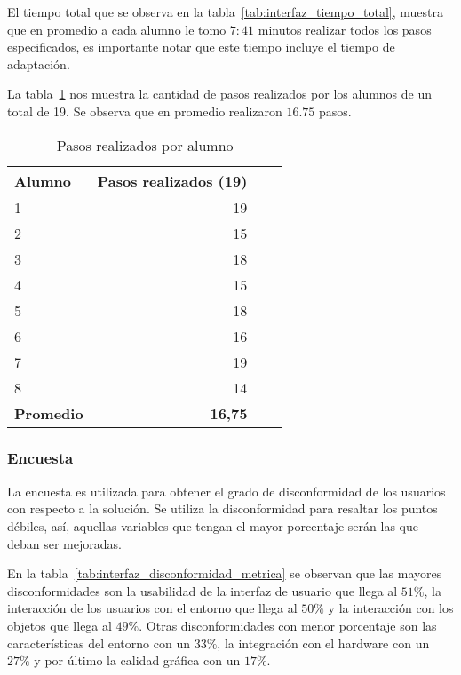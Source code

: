 El tiempo total que se observa en la tabla~\ref{tab:interfaz_tiempo_total},
muestra que en promedio a cada alumno le tomo $7:41$ minutos realizar todos los
pasos especificados, es importante notar que este tiempo incluye el tiempo de
adaptación. 

La tabla~\ref{tab:interfaz_acciones} nos muestra la cantidad de pasos
realizados por los alumnos de un total de 19. Se observa que en promedio 
realizaron $16.75$ pasos.

\begin{table}[htb]
\centering
\small
\begin{tabular}{lrrr}
\toprule
\textbf{Alumno} & \textbf{Pasos realizados (19)} \\
\midrule
1 & 19 \\
2 & 15 \\
3 & 18 \\
4 & 15 \\
5 & 18 \\
6 & 16 \\
7 & 19 \\
8 & 14 \\
\midrule
\textbf{Promedio} & \textbf{16,75} \\
\bottomrule
\end{tabular}
\caption{Pasos realizados por alumno}
\label{tab:interfaz_acciones}
\end{table}



\subsubsection{Encuesta}


La encuesta es utilizada para obtener el grado de disconformidad de los usuarios
con respecto a la solución. Se utiliza la disconformidad para resaltar los
puntos débiles, así, aquellas variables que tengan el mayor porcentaje serán las
que deban ser mejoradas.


En la tabla~\ref{tab:interfaz_disconformidad_metrica} se observan que las
mayores disconformidades son la usabilidad de la interfaz de usuario que llega
al $51\%$, la interacción de los usuarios con el entorno que llega al $50\%$ y
la interacción con los objetos que llega al $49\%$. Otras disconformidades con
menor porcentaje son las características del entorno con un  $33\%$, la
integración con el hardware con un $27\%$ y por último la calidad gráfica con un
$17\%$.


